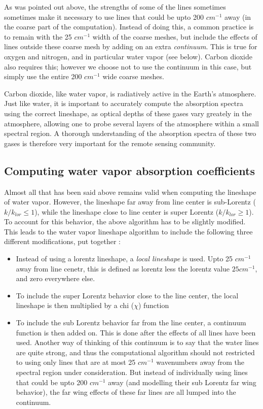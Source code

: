 \documentclass[11pt]{article}
\begin{document}
As was pointed out above, the strengths of some of the lines sometimes
sometimes make it necessary to use lines that could be upto 200 $cm^{-1}$ 
away (in the coarse part of the computation). Instead of doing this, a 
common practice is to remain with the 25 $cm^{-1}$ width of the coarse 
meshes, but include the effects of lines outside these coarse mesh by adding
on an extra {\it continuum}. This is true for oxygen and nitrogen, and in
particular water vapor (see below). Carbon dioxide also requires this; 
however we choose not to use the continuum in this case, but simply use the
entire 200 $cm^{-1}$ wide coarse meshes.

Carbon dioxide, like water vapor, is radiatively active in the Earth's 
atmosphere. Just like water, it is important to accurately compute the
absorption spectra using the correct lineshape, as optical depths of these
gases vary greately in the atmosphere, allowing one to probe several 
layers of the atmosphere within a small spectral region. A thorough 
understanding of the absorption spectra of these two gases is therefore 
very important for the remote sensing community.

\subsection{Computing water vapor absorption coefficients}
Almost all that has been said above remains valid when computing the 
lineshape of water vapor. However, the lineshape far away from line 
center is sub-Lorentz ($k/k_{lor} \leq 1$), while the lineshape close to 
line center is super Lorentz ($k/k_{lor} \geq 1$).  To account for this 
behavior, the above algorithm has to be slightly modified. This leads to 
the water vapor lineshape algorithm to include the following three 
different modifications, put together : 
\begin{itemize}
\item Instead of using a lorentz lineshape, a {\it local lineshape} is used.
      Upto 25 $cm^{-1}$ away from line cenetr, this is defined as 
      lorentz less the lorentz value \@ $25 cm^{-1}$, and zero everywhere 
      else.
\item To include the super Lorentz behavior close to the line center, 
      the local lineshape is then multiplied by a chi ($\chi$) function
\item To include the sub Lorentz behavior far from the line center, 
      a continuum function is then added on. This is done after the 
      effects of all lines have been used. Another way of thinking of this 
      continuum is to say that the water lines are quite strong, and thus
      the computational algorithm should not restricted to using only lines
      that are at most 25 $cm^{-1}$ wavenumbers away from the spectral 
      region under consideration. But instead of individually using lines 
      that could be upto 200 $cm^{-1}$ away (and modelling their
      sub Lorentz far wing behavior), the far wing effects of these far 
      lines are all lumped into the continuum.
\end{itemize}
\end{document}
